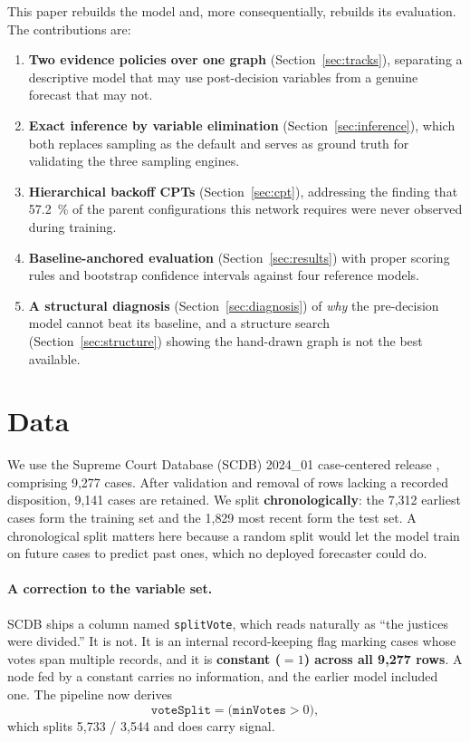 \documentclass[11pt]{article}
\newcommand{\code}[1]{\texttt{#1}}
\begin{document}
This paper rebuilds the model and, more consequentially, rebuilds its
evaluation. The contributions are:

\begin{enumerate}
  \item \textbf{Two evidence policies over one graph} (Section~\ref{sec:tracks}),
        separating a descriptive model that may use post-decision variables from
        a genuine forecast that may not.
  \item \textbf{Exact inference by variable elimination} (Section~\ref{sec:inference}),
        which both replaces sampling as the default and serves as ground truth
        for validating the three sampling engines.
  \item \textbf{Hierarchical backoff CPTs} (Section~\ref{sec:cpt}), addressing
        the finding that \SI{57.2}{\percent} of the parent configurations this
        network requires were never observed during training.
  \item \textbf{Baseline-anchored evaluation} (Section~\ref{sec:results}) with
        proper scoring rules and bootstrap confidence intervals against four
        reference models.
  \item \textbf{A structural diagnosis} (Section~\ref{sec:diagnosis}) of
        \emph{why} the pre-decision model cannot beat its baseline, and a
        structure search (Section~\ref{sec:structure}) showing the hand-drawn
        graph is not the best available.
\end{enumerate}

\section{Data}

We use the Supreme Court Database (SCDB) 2024\_01 case-centered release
\cite{scdb}, comprising 9{,}277 cases. After validation and removal of rows
lacking a recorded disposition, 9{,}141 cases are retained. We split
\textbf{chronologically}: the 7{,}312 earliest cases form the training set and
the 1{,}829 most recent form the test set. A chronological split matters here
because a random split would let the model train on future cases to predict past
ones, which no deployed forecaster could do.

\paragraph{A correction to the variable set.}
SCDB ships a column named \code{splitVote}, which reads naturally as ``the
justices were divided.'' It is not. It is an internal record-keeping flag
marking cases whose votes span multiple records, and it is \textbf{constant
($=1$) across all 9{,}277 rows}. A node fed by a constant carries no
information, and the earlier model included one. The pipeline now derives
\[
  \code{voteSplit} = \big(\code{minVotes} > 0\big),
\]
which splits 5{,}733 / 3{,}544 and does carry signal.
\end{document}
